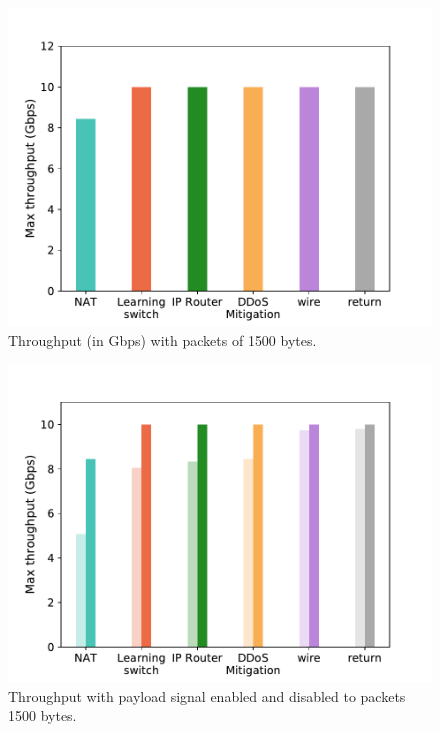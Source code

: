 \begin{figure}[ht]
\centering
\includegraphics[width=1.\linewidth]{figures/throughput_gbps_1500B.pdf}
\caption{Throughput (in Gbps) with packets of 1500 bytes.}
\label{fig:throughput1500}
\end{figure}

\begin{figure}[ht]
\centering
\includegraphics[width=1.\linewidth]{figures/payload-1500B.pdf}
\caption{Throughput with payload signal enabled and disabled to packets 1500 bytes.}
\label{fig:payload-1500B}
\end{figure}

